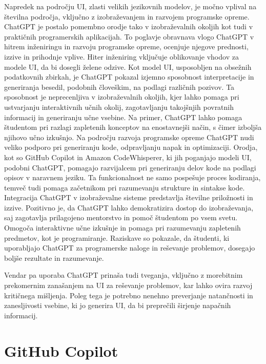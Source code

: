 \documentclass[12pt,a4paper]{book}
\begin{document}
Napredek na področju UI, zlasti velikih jezikovnih modelov, je močno vplival na številna področja, vključno z izobraževanjem in razvojem programske opreme. ChatGPT je postalo pomembno orodje tako v izobraževalnih okoljih kot tudi v praktičnih programerskih aplikacijah. To poglavje obravnava vlogo ChatGPT v hitrem inženiringu in razvoju programske opreme, ocenjuje njegove prednosti, izzive in prihodnje vplive.
Hiter inženiring vključuje oblikovanje vhodov za modele UI, da bi dosegli želene odzive. Kot model UI, usposobljen na obsežnih podatkovnih zbirkah, je ChatGPT pokazal izjemno sposobnost interpretacije in generiranja besedil, podobnih človeškim, na podlagi različnih pozivov. Ta sposobnost je neprecenljiva v izobraževalnih okoljih, kjer lahko pomaga pri ustvarjanju interaktivnih učnih okolij, zagotavljanju takojšnjih povratnih informacij in generiranju učne vsebine. Na primer, ChatGPT lahko pomaga študentom pri razlagi zapletenih konceptov na enostavnejši način, s čimer izboljša njihovo učno izkušnjo.
Na področju razvoja programske opreme ChatGPT nudi veliko podporo pri generiranju kode, odpravljanju napak in optimizaciji. Orodja, kot so GitHub Copilot in Amazon CodeWhisperer, ki jih poganjajo modeli UI, podobni ChatGPT, pomagajo razvijalcem pri generiranju delov kode na podlagi opisov v naravnem jeziku. Ta funkcionalnost ne samo pospešuje proces kodiranja, temveč tudi pomaga začetnikom pri razumevanju strukture in sintakse kode.
Integracija ChatGPT v izobraževalne sisteme predstavlja številne priložnosti in izzive. Pozitivno je, da ChatGPT lahko demokratizira dostop do izobraževanja, saj zagotavlja prilagojeno mentorstvo in pomoč študentom po vsem svetu. Omogoča interaktivne učne izkušnje in pomaga pri razumevanju zapletenih predmetov, kot je programiranje. Raziskave so pokazale, da študenti, ki uporabljajo ChatGPT za programerske naloge in reševanje problemov, dosegajo boljše rezultate in razumevanje.

Vendar pa uporaba ChatGPT prinaša tudi tveganja, vključno z morebitnim prekomernim zanašanjem na UI za reševanje problemov, kar lahko ovira razvoj kritičnega mišljenja. Poleg tega je potrebno nenehno preverjanje natančnosti in zanesljivosti vsebine, ki jo generira UI, da bi preprečili širjenje napačnih informacij.
\cite{app13095783}
\section{GitHub Copilot}
\end{document}
